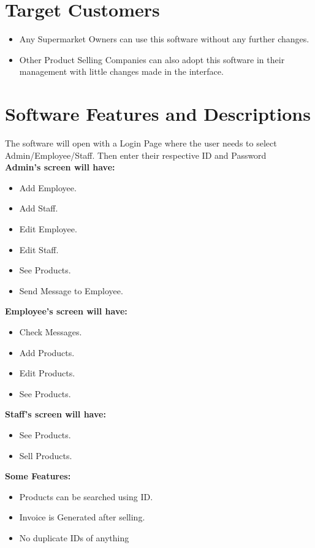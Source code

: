\documentclass{article}
\begin{document}
\section*{\LARGE Target Customers}
\large 
\begin{itemize}
    \item \large Any Supermarket Owners can use this software without any further changes. 
    \item \large Other Product Selling Companies can also adopt this software in their management with little changes made in the interface.
\end{itemize}

{}
\section*{\LARGE Software Features and Descriptions}
The software will open with a Login Page where the user needs to select Admin/Employee/Staff. Then enter their respective ID and Password \\

\textbf {\Large Admin's screen will have:}
\begin{itemize}
    \item \large Add Employee.
    \item \large Add Staff.
    \item \large Edit Employee.
    \item \large Edit Staff.
    \item \large See Products.
    \item \large Send Message to Employee.  \\
\end{itemize} 
\pagebreak

\textbf {\Large Employee's screen will have:}
\begin{itemize}
    \item \large Check Messages.
    \item \large Add Products.
    \item \large Edit Products.
    \item\large  See Products.\\
\end{itemize} 

\textbf {\Large Staff's screen will have:}
\begin{itemize}
    \item\large  See Products.
    \item \large Sell Products.\\
\end{itemize} 
\textbf {\Large Some Features:}
\begin{itemize}
    \item\large  Products can be searched using ID.
    \item \large Invoice is Generated after selling.
    \item \large No duplicate IDs of anything\\
\end{itemize} 
\end{document}
